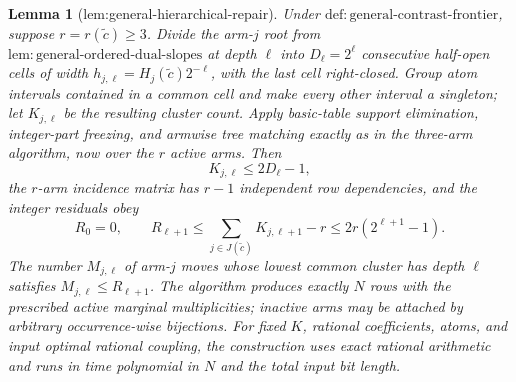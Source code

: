 \documentclass{article}
\newtheorem{lemma}{Lemma}
\begin{document}
\begin{lemma}[lem:general-hierarchical-repair]\label{lem:general-hierarchical-repair}
Under \(\mathrm{def{:}general\mbox{-}contrast\mbox{-}frontier}\), suppose \(r=r(\widetilde c)\ge3\).  Divide the arm-\(j\) root from \(\mathrm{lem{:}general\mbox{-}ordered\mbox{-}dual\mbox{-}slopes}\) at depth \(\ell\) into \(D_\ell=2^\ell\) consecutive half-open cells of width \(h_{j,\ell}=H_j(\widetilde c)2^{-\ell}\), with the last cell right-closed.  Group atom intervals contained in a common cell and make every other interval a singleton; let \(K_{j,\ell}\) be the resulting cluster count.  Apply basic-table support elimination, integer-part freezing, and armwise tree matching exactly as in the three-arm algorithm, now over the \(r\) active arms.  Then
\[
 K_{j,\ell}\le2D_\ell-1,
\]
the \(r\)-arm incidence matrix has \(r-1\) independent row dependencies, and the integer residuals obey
\[
 R_0=0,\qquad
 R_{\ell+1}\le\sum_{j\in J(\widetilde c)}K_{j,\ell+1}-r
 \le2r(2^{\ell+1}-1).
\]
The number \(M_{j,\ell}\) of arm-\(j\) moves whose lowest common cluster has depth \(\ell\) satisfies \(M_{j,\ell}\le R_{\ell+1}\).  The algorithm produces exactly \(N\) rows with the prescribed active marginal multiplicities; inactive arms may be attached by arbitrary occurrence-wise bijections.  For fixed \(K\), rational coefficients, atoms, and input optimal rational coupling, the construction uses exact rational arithmetic and runs in time polynomial in \(N\) and the total input bit length.
\end{lemma}
\end{document}

